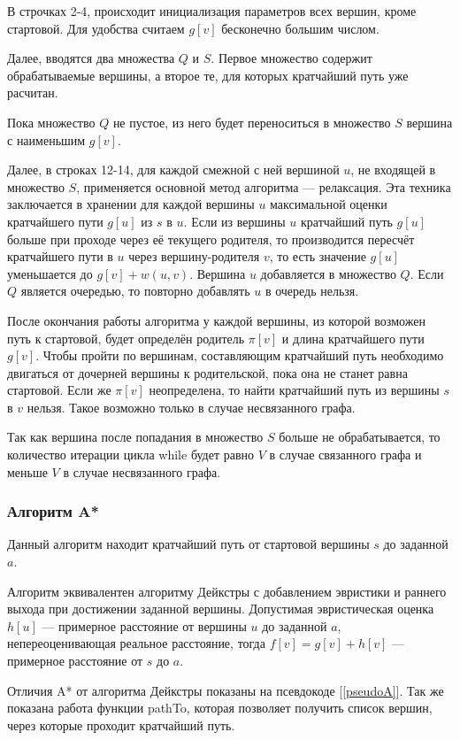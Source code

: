 В строчках 2-4, происходит инициализация параметров всех вершин, кроме стартовой. Для удобства считаем $g[v]$ бесконечно большим числом.

Далее, вводятся два множества $Q$ и $S$. Первое множество содержит обрабатываемые вершины, а второе те, для которых кратчайший путь уже расчитан.

Пока множество $Q$ не пустое, из него будет переноситься в множество $S$ вершина с наименьшим $g[v]$.

Далее, в строках 12-14, для каждой смежной с ней вершиной $u$, не входящей в множество $S$, применяется основной метод алгоритма — релаксация. Эта техника заключается в хранении для каждой вершины $u$ максимальной оценки кратчайшего пути $g[u]$ из $s$ в $u$. Если из вершины $u$ кратчайший путь $g[u]$ больше при проходе через её текущего родителя, то производится пересчёт кратчайшего пути в $u$ через вершину-родителя $v$, то есть значение $g[u]$ уменьшается до $g[v] + w(u,v)$. Вершина $u$ добавляется в множество $Q$. Если $Q$ является очередью, то повторно добавлять $u$ в очередь нельзя.

После окончания работы алгоритма у каждой вершины, из которой возможен путь к стартовой, будет определён родитель $\pi[v]$ и длина кратчайшего пути $g[v]$. Чтобы пройти по вершинам, составляющим кратчайший путь необходимо двигаться от дочерней вершины к родительской, пока она не станет равна стартовой. Если же $\pi[v]$ неопределена, то найти кратчайший путь из вершины $s$ в $v$ нельзя. Такое возможно только в случае несвязанного графа.

Так как вершина после попадания в множество $S$ больше не обрабатывается, то количество итерации цикла while будет равно $V$ в случае связанного графа и меньше $V$ в случае несвязанного графа.

\subsubsection{Алгоритм A*}
Данный алгоритм находит кратчайший путь от стартовой вершины $s$ до заданной $a$.

Алгоритм эквивалентен алгоритму Дейкстры с добавлением эвристики и раннего выхода при достижении заданной вершины. Допустимая эвристическая оценка $h[u]$ — примерное расстояние от вершины $u$ до заданной $a$, непереоценивающая реальное расстояние, тогда $f[v] = g[v] + h[v]$ — примерное расстояние от $s$ до $a$.

Отличия A* от алгоритма Дейкстры показаны на псевдокоде [\ref{pseudoA}]. Так же показана работа функции pathTo, которая позволяет получить список вершин, через которые проходит кратчайший путь.

